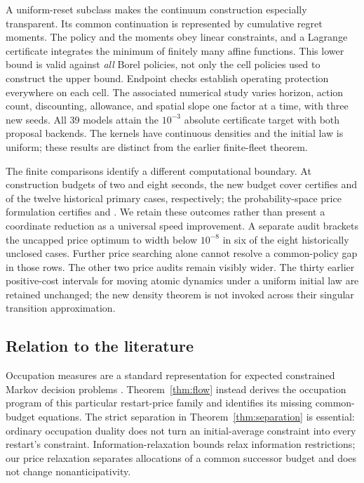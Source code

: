 A uniform-reset subclass makes the continuum construction especially transparent. Its common continuation is represented by cumulative regret moments. The policy and the moments obey linear constraints, and a Lagrange certificate integrates the minimum of finitely many affine functions. This lower bound is valid against \emph{all} Borel policies, not only the cell policies used to construct the upper bound. Endpoint checks establish operating protection everywhere on each cell. The associated numerical study varies horizon, action count, discounting, allowance, and spatial slope one factor at a time, with three new seeds. All 39 models attain the $10^{-3}$ absolute certificate target with both proposal backends. The kernels have continuous densities and the initial law is uniform; these results are distinct from the earlier finite-fleet theorem.

The finite comparisons identify a different computational boundary. At construction budgets of two and eight seconds, the new budget cover certifies \RFFBudgetTwo{} and \RFFBudgetEight{} of the twelve historical primary cases, respectively; the probability-space price formulation certifies \RFFPriceTwo{} and \RFFPriceEight{}. We retain these outcomes rather than present a coordinate reduction as a universal speed improvement. A separate audit brackets the uncapped price optimum to width below $10^{-8}$ in six of the eight historically unclosed cases. Further price searching alone cannot resolve a common-policy gap in those rows. The other two price audits remain visibly wider. The thirty earlier positive-cost intervals for moving atomic dynamics under a uniform initial law are retained unchanged; the new density theorem is not invoked across their singular transition approximation.

\subsection{Relation to the literature}
Occupation measures are a standard representation for expected constrained Markov decision problems \citep{Altman1999}. Theorem~\ref{thm:flow} instead derives the occupation program of this particular restart-price family and identifies its missing common-budget equations. The strict separation in Theorem~\ref{thm:separation} is essential: ordinary occupation duality does not turn an initial-average constraint into every restart's constraint. Information-relaxation bounds \citep{BrownSmithSun2010,BrownSmith2014} relax information restrictions; our price relaxation separates allocations of a common successor budget and does not change nonanticipativity.

